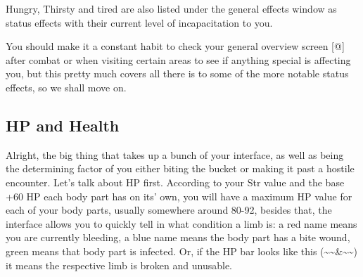 Hungry, Thirsty and tired are also listed under the general effects window as status effects with their current level of incapacitation to you.

You should make it a constant habit to check your general overview screen [@] after combat or when visiting certain areas to see if anything special is affecting you, but this pretty much covers all there is to some of the more notable status effects, so we shall move on.

\subsection{HP and Health}

Alright, the big thing that takes up a bunch of your interface, as well as being the determining factor of you either biting the bucket or making it past a hostile encounter. Let's talk about HP first. According to your Str value and the base +60 HP each body part has on its' own, you will have a maximum HP value for each of your body parts, usually somewhere around 80-92, besides that, the interface allows you to quickly tell in what condition a limb is: a red name means you are currently bleeding, a blue name means the body part has a bite wound, green means that body part is infected. Or, if the HP bar looks like this (\~{}\~{}\&\~{}\~{}) it means the respective limb is broken and unusable.

